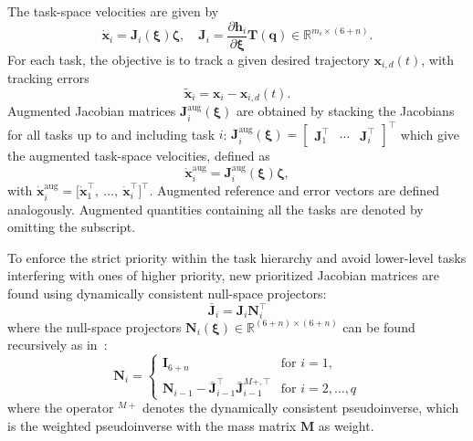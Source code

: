 \documentclass[../main.tex]{subfiles}
\begin{document}
The task-space velocities are given by
\begin{equation}
    \dot{\bm{x}}_i = \bm{J}_i ( \bm{\xi} ) \bm{\zeta}, \quad \bm{J}_i = \frac{\partial \bm{h}_i}{\partial \bm{\xi}} \bm{T} ( \bm{q} ) \in \mathbb{R}^{m_i \times (6+n)}.
\end{equation}
For each task, the objective is to track a given desired trajectory $\bm{x}_{i,d}(t)$, with tracking errors %
\begin{equation}
    \tilde{\bm{x}}_i = \bm{x}_i - \bm{x}_{i,d}(t).
\end{equation}
Augmented Jacobian matrices $\bm{J}^{\textrm{aug}}_i( \bm{\xi} )$ are obtained by stacking the Jacobians for all tasks up to and including task $i$:
$\bm{J}^{\textrm{aug}}_i( \bm{\xi} ) = \begin{bmatrix}
    \bm{J}_1^\top & \cdots & \bm{J}_i^\top
\end{bmatrix}^\top$ which give the augmented task-space velocities, defined as
\begin{equation}
    \dot{\bm{x}}^{\textrm{aug}}_i = \bm{J}^{\textrm{aug}}_i(\bm{\xi}) \bm{\zeta},
\end{equation}
with $\dot{\bm{x}}^{\textrm{aug}}_i = \bigl[ \dot{\bm{x}}_1^\top,\ \ldots, \ \dot{\bm{x}}_i^\top \bigr]^\top$.
Augmented reference and error vectors are defined analogously. Augmented quantities containing all the tasks are denoted by omitting the subscript.

To enforce the strict priority within the task hierarchy and avoid lower-level tasks interfering with ones of higher priority, new prioritized Jacobian matrices are found using dynamically consistent null-space projectors:
\begin{equation}\label{eq:tasks:Ji_bar}
    \bar{\bm{J}}_i = \bm{J}_i \bm{N}_i^\top
\end{equation}
where the null-space projectors $\bm{N}_i(\bm{\xi}) \in \mathbb{R}^{(6+n) \times (6+n)}$ can be found recursively as in~\cite{Wu2022}:
\begin{equation}\label{eq:tasks:Ni}
    \bm{N}_i = \begin{cases}
        \bm{I}_{6+n} & \textrm{for } i= 1,\\
        \bm{N}_{i-1}  - \bar{\bm{J}}_{i-1}^\top \bar{\bm{J}}_{i-1}^{M+,\top} & \textrm{for } i = 2,\ldots,q
    \end{cases}
\end{equation}
where the operator $^{M+}$ denotes the dynamically consistent pseudoinverse, which is the weighted pseudoinverse with the mass matrix $\bm{M}$ as weight.
\end{document}
